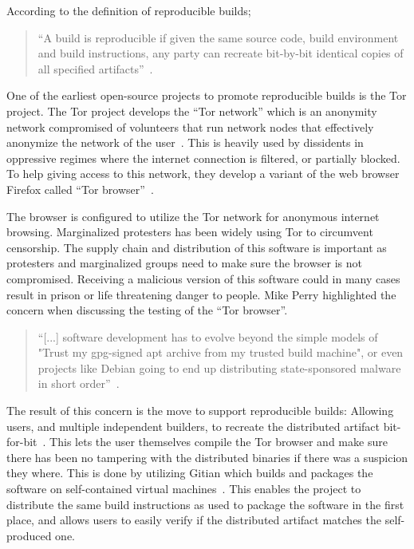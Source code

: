 \documentclass[../Main/thesis.tex]{subfiles}
\begin{document}
According to the definition of reproducible builds;

\begin{quotation}
``A build is reproducible if given the same source code, build environment
and build instructions, any party can recreate bit-by-bit identical copies of
all specified artifacts''~\cite{reproducible-builds-2019-definitions}.
\end{quotation}

One of the earliest open-source projects to promote reproducible builds is the
Tor project. The Tor project develops the ``Tor network'' which is an anonymity
network compromised of volunteers that run network nodes that effectively
anonymize the network of the user~\cite{tor}. This is heavily used by dissidents
in oppressive regimes where the internet connection is filtered, or partially
blocked. To help giving access to this network, they develop a variant of the
web browser Firefox called ``Tor browser''~\cite{tor-browser}.

The browser is configured to utilize the Tor network for anonymous internet
browsing. Marginalized protesters has been widely using Tor to circumvent
censorship. The supply chain and distribution of this software is important as
protesters and marginalized groups need to make sure the browser is not
compromised. Receiving a malicious version of this software could in many cases
result in prison or life threatening danger to people. Mike Perry highlighted
the concern when discussing the testing of the ``Tor browser''.

\begin{quotation}
    ``[...] software development has to evolve beyond the simple models of
"Trust my gpg-signed apt archive from my trusted build machine", or even
projects like Debian going to end up distributing state-sponsored malware in
short order''~\cite{mike-perry-2013}.
\end{quotation}

The result of this concern is the move to support reproducible builds: Allowing
users, and multiple independent builders, to recreate the distributed artifact
bit-for-bit~\cite{unknown-2014}. This lets the user themselves compile the Tor
browser and make sure there has been no tampering with the distributed binaries
if there was a suspicion they where. This is done by utilizing Gitian which
builds and packages the software on self-contained virtual
machines~\cite{gitian}. This enables the project to distribute the same build
instructions as used to package the software in the first place, and allows
users to easily verify if the distributed artifact matches the self-produced
one.
\end{document}
